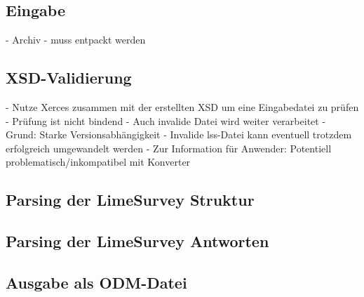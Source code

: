 \subsection{Eingabe}

- Archiv
	- muss entpackt werden

\subsection{XSD-Validierung}

- Nutze Xerces zusammen mit der erstellten XSD um eine Eingabedatei zu prüfen
- Prüfung ist nicht bindend
	- Auch invalide Datei wird weiter verarbeitet
	- Grund: Starke Versionsabhängigkeit
		 - Invalide lss-Datei kann eventuell trotzdem erfolgreich umgewandelt werden
	- Zur Information für Anwender: Potentiell problematisch/inkompatibel mit Konverter

\subsection{Parsing der LimeSurvey Struktur}

\subsection{Parsing der LimeSurvey Antworten}

\subsection{Ausgabe als ODM-Datei}



